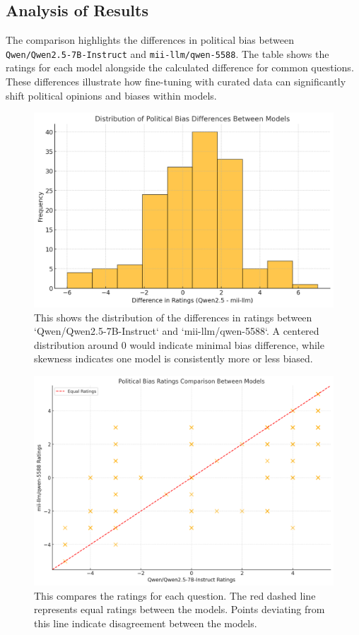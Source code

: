 \documentclass[10pt]{article}
\begin{document}
\subsection*{Analysis of Results}
The comparison highlights the differences in political bias between \texttt{Qwen/Qwen2.5-7B-Instruct} and \texttt{mii-llm/qwen-5588}. The table shows the ratings for each model alongside the calculated difference for common questions. These differences illustrate how fine-tuning with curated data can significantly shift political opinions and biases within models.

\begin{figure}[h!]
    \centering
    \includegraphics[width=\textwidth]{qwen_vs_miillm_bars.png}
    \caption{This shows the distribution of the differences in ratings between `Qwen/Qwen2.5-7B-Instruct` and `mii-llm/qwen-5588`. A centered distribution around 0 would indicate minimal bias difference, while skewness indicates one model is consistently more or less biased.}
    \label{fig:qwen_vs_miillm_bars}
\end{figure}

\begin{figure}[h!]
    \centering
    \includegraphics[width=\textwidth]{qwen_vs_miillm_points.png}
    \caption{This compares the ratings for each question. The red dashed line represents equal ratings between the models. Points deviating from this line indicate disagreement between the models.
}
    \label{fig:qqwen_vs_miillm_points.png}
\end{figure}
\end{document}
